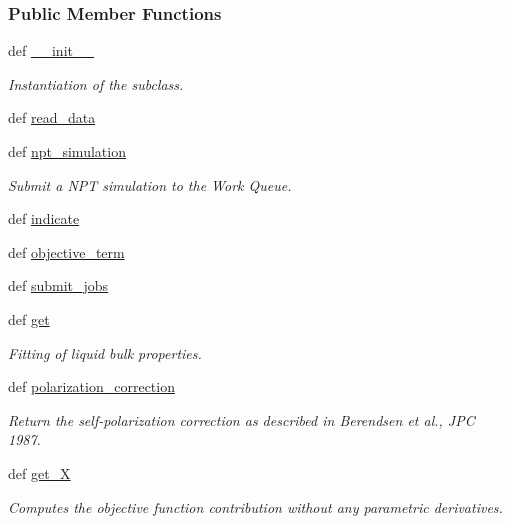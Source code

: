 \subsubsection*{Public Member Functions}
\begin{DoxyCompactItemize}
\item 
def \hyperlink{classforcebalance_1_1liquid_1_1Liquid_a73a35541914580d0d918d34d94065f39}{\-\_\-\-\_\-init\-\_\-\-\_\-}
\begin{DoxyCompactList}\small\item\em Instantiation of the subclass. \end{DoxyCompactList}\item 
def \hyperlink{classforcebalance_1_1liquid_1_1Liquid_a08b698af913d56f780d0587821c922cd}{read\-\_\-data}
\item 
def \hyperlink{classforcebalance_1_1liquid_1_1Liquid_a07a59f9f335693329b789a9c7608fc9f}{npt\-\_\-simulation}
\begin{DoxyCompactList}\small\item\em Submit a N\-P\-T simulation to the Work Queue. \end{DoxyCompactList}\item 
def \hyperlink{classforcebalance_1_1liquid_1_1Liquid_ae94ce30dfd0e92fdd6d746e6743be844}{indicate}
\item 
def \hyperlink{classforcebalance_1_1liquid_1_1Liquid_a00c23db61bcb86cc19f79dacdb2bc1f3}{objective\-\_\-term}
\item 
def \hyperlink{classforcebalance_1_1liquid_1_1Liquid_a716e28bb5572b3273036ac753b7e1e1d}{submit\-\_\-jobs}
\item 
def \hyperlink{classforcebalance_1_1liquid_1_1Liquid_a802c4139e5c002fabdeab5de88093880}{get}
\begin{DoxyCompactList}\small\item\em Fitting of liquid bulk properties. \end{DoxyCompactList}\item 
def \hyperlink{classforcebalance_1_1liquid_1_1Liquid_a51ea9d9fb4418ec2497fe8e2d8033d41}{polarization\-\_\-correction}
\begin{DoxyCompactList}\small\item\em Return the self-\/polarization correction as described in Berendsen et al., J\-P\-C 1987. \end{DoxyCompactList}\item 
def \hyperlink{classforcebalance_1_1target_1_1Target_a606dd136f195c267c05a2455405e5949}{get\-\_\-\-X}
\begin{DoxyCompactList}\small\item\em Computes the objective function contribution without any parametric derivatives. \end{DoxyCompactList}\item 

\end{DoxyCompactItemize}
